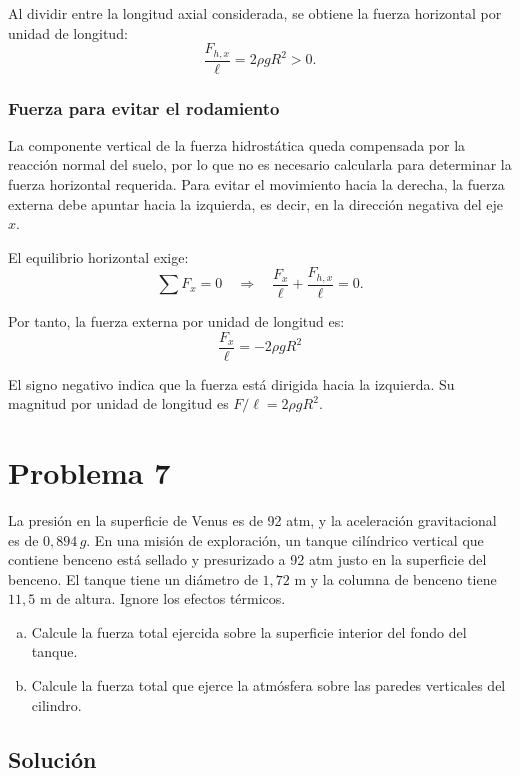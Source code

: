 \documentclass[a4paper]{article}
\begin{document}
Al dividir entre la longitud axial considerada, se obtiene la fuerza horizontal por unidad de longitud:
$$
\frac{F_{h,x}}{\ell}=2\rho gR^2>0.
$$

\subsubsection{Fuerza para evitar el rodamiento}

La componente vertical de la fuerza hidrostática queda compensada por la reacción normal del suelo, por lo que no es necesario calcularla para determinar la fuerza horizontal requerida. Para evitar el movimiento hacia la derecha, la fuerza externa debe apuntar hacia la izquierda, es decir, en la dirección negativa del eje $x$.

El equilibrio horizontal exige:
$$
\sum F_x=0
\quad\Longrightarrow\quad
\frac{F_x}{\ell}+\frac{F_{h,x}}{\ell}=0.
$$

Por tanto, la fuerza externa por unidad de longitud es:
$$
\boxed{\frac{F_x}{\ell}=-2\rho gR^2}
$$

El signo negativo indica que la fuerza está dirigida hacia la izquierda. Su magnitud por unidad de longitud es $\boxed{F/\ell=2\rho gR^2}$.

\section{Problema 7}
La presión en la superficie de Venus es de 92 atm, y la aceleración gravitacional es de $0{,}894\,g$. En una misión de exploración, un tanque cilíndrico vertical que contiene benceno está sellado y presurizado a 92 atm justo en la superficie del benceno. El tanque tiene un diámetro de $1{,}72$ m y la columna de benceno tiene $11{,}5$ m de altura. Ignore los efectos térmicos.
\begin{enumerate}[a)]
    \item Calcule la fuerza total ejercida sobre la superficie interior del fondo del tanque.
    \item Calcule la fuerza total que ejerce la atmósfera sobre las paredes verticales del cilindro.
\end{enumerate}



\subsection{Solución}
\end{document}
